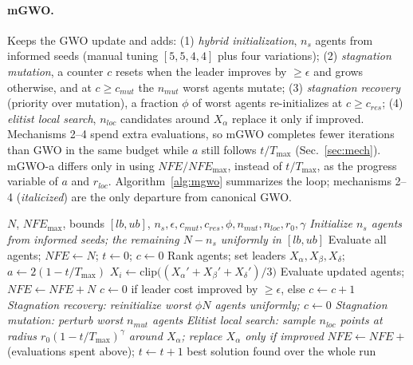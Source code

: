 \documentclass[10pt,journal,compsoc]{IEEEtran}
\newcommand{\mgwo}{mGWO}
\newcommand{\mgwoa}{mGWO-a}
\begin{document}
\paragraph{\mgwo{}.} Keeps the GWO update and adds: (1) \emph{hybrid initialization}, $n_s$ agents from informed seeds (manual tuning $[5,5,4,4]$ plus four variations); (2) \emph{stagnation mutation}, a counter $c$ resets when the leader improves by $\ge\epsilon$ and grows otherwise, and at $c\ge c_{mut}$ the $n_{mut}$ worst agents mutate; (3) \emph{stagnation recovery} (priority over mutation), a fraction $\phi$ of worst agents re-initializes at $c\ge c_{res}$; (4) \emph{elitist local search}, $n_{loc}$ candidates around $X_\alpha$ replace it only if improved. Mechanisms 2--4 spend extra evaluations, so \mgwo{} completes fewer iterations than GWO in the same budget while $a$ still follows $t/T_{\max}$ (Sec.~\ref{sec:mech}). \mgwoa{} differs only in using $NFE/NFE_{\max}$, instead of $t/T_{\max}$, as the progress variable of $a$ and $r_{loc}$. Algorithm~\ref{alg:mgwo} summarizes the loop; mechanisms 2--4 (\emph{italicized}) are the only departure from canonical GWO.

\begin{algorithm}[t]
\caption{\mgwo{} (canonical GWO update in step 6; \emph{italics} mark the four added mechanisms)}
\label{alg:mgwo}
\begin{algorithmic}[1]
\REQUIRE $N$, $NFE_{\max}$, bounds $[lb,ub]$, $n_s,\epsilon,c_{mut},c_{res},\phi,n_{mut},n_{loc},r_0,\gamma$
\STATE \emph{Initialize $n_s$ agents from informed seeds; the remaining $N-n_s$ uniformly in $[lb,ub]$}
\STATE Evaluate all agents; $NFE\gets N$; $t\gets0$; $c\gets0$
\STATE Rank agents; set leaders $X_\alpha,X_\beta,X_\delta$; $a\gets2(1-t/T_{\max})$
\STATE $X_i\gets\mathrm{clip}\bigl((X_\alpha'+X_\beta'+X_\delta')/3\bigr)$ 
\ENDFOR
\STATE Evaluate updated agents; $NFE\gets NFE+N$
\STATE $c\gets0$ if leader cost improved by $\ge\epsilon$, else $c\gets c+1$
\STATE \emph{Stagnation recovery: reinitialize worst $\phi N$ agents uniformly; $c\gets0$}
\STATE \emph{Stagnation mutation: perturb worst $n_{mut}$ agents}
\ENDIF
\STATE \emph{Elitist local search: sample $n_{loc}$ points at radius $r_0(1-t/T_{\max})^\gamma$ around $X_\alpha$; replace $X_\alpha$ only if improved}
\STATE $NFE\gets NFE+$ (evaluations spent above); $t\gets t+1$
\ENDWHILE
\RETURN best solution found over the whole run
\end{algorithmic}
\end{algorithm}
\end{document}
